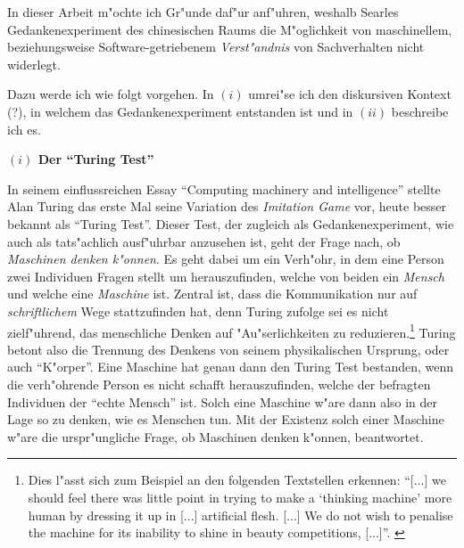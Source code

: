 \documentclass[a4paper, emulatestandardclasses, 12pt]{scrartcl}
\begin{document}
\begin{onehalfspace} 

%


\noindent In dieser Arbeit m"ochte ich Gr"unde daf"ur anf"uhren, weshalb Searles Gedankenexperiment des chinesischen Raums die M"oglichkeit von maschinellem, beziehungsweise Software-getriebenem \emph{Verst"andnis} von Sachverhalten nicht widerlegt. 

Dazu werde ich wie folgt vorgehen. In $(i)$ umrei"se ich den diskursiven Kontext (?), in welchem das Gedankenexperiment entstanden ist und in $(ii)$ beschreibe ich es. %
\vspace{5mm}


\noindent\textbf{$(i)$ Der "`Turing Test"'}

\noindent In seinem einflussreichen Essay "`Computing machinery and intelligence"' \citep{turing1950computing} stellte Alan Turing das erste Mal seine Variation des \emph{Imitation Game} vor, heute besser bekannt als "`Turing Test"'. Dieser Test, der zugleich als Gedankenexperiment, wie auch als tats"achlich ausf"uhrbar anzusehen ist, geht der Frage nach, ob \emph{Maschinen denken k"onnen}. Es geht dabei um ein Verh"ohr, in dem eine Person zwei Individuen Fragen stellt um herauszufinden, welche von beiden ein \emph{Mensch} und welche eine \emph{Maschine} ist. Zentral ist, dass die Kommunikation nur auf \emph{schriftlichem} Wege stattzufinden hat, denn Turing zufolge sei es nicht zielf"uhrend, das menschliche Denken auf "Au"serlichkeiten zu reduzieren.\footnote{Dies l"asst sich zum Beispiel an den folgenden Textstellen erkennen: "`[...] we should feel there was little point in trying to make a `thinking machine' more human by dressing it up in [...] artificial flesh. [...] We do not wish to penalise the machine for its inability to shine in beauty competitions, [...]"'. \citep[S. 434]{turing1950computing}} Turing betont also die Trennung des Denkens von seinem physikalischen Ursprung, oder auch "`K"orper"'. Eine Maschine hat genau dann den Turing Test bestanden, wenn die verh"ohrende Person es nicht schafft herauszufinden, welche der befragten Individuen der "`echte Mensch"' ist. Solch eine Maschine w"are dann also in der Lage so zu denken, wie es Menschen tun. Mit der Existenz solch einer Maschine w"are die urspr"ungliche Frage, ob Maschinen denken k"onnen, beantwortet.


\end{onehalfspace}
\end{document}
